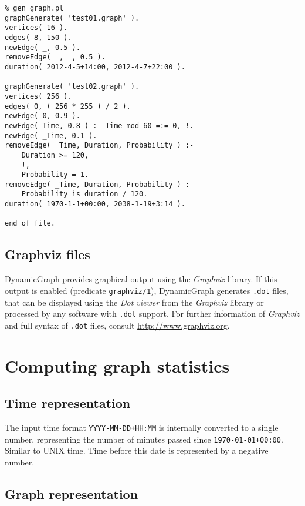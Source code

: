 \documentclass[11pt, a4paper,draft]{article}
\newcommand{\pl}[1]{\texttt{#1}} %
\theoremstyle{plain}
\theoremstyle{definition}
\theoremstyle{remark}
\newcommand{\gv}{\textit{Graphviz}}
\begin{document}
\begin{verbatim}
% gen_graph.pl
graphGenerate( 'test01.graph' ).
vertices( 16 ).
edges( 8, 150 ).
newEdge( _, 0.5 ).
removeEdge( _, _, 0.5 ).
duration( 2012-4-5+14:00, 2012-4-7+22:00 ).

graphGenerate( 'test02.graph' ).
vertices( 256 ).
edges( 0, ( 256 * 255 ) / 2 ).
newEdge( 0, 0.9 ).
newEdge( Time, 0.8 ) :- Time mod 60 =:= 0, !.
newEdge( _Time, 0.1 ).
removeEdge( _Time, Duration, Probability ) :-
    Duration >= 120,
    !,
    Probability = 1.
removeEdge( _Time, Duration, Probability ) :-
    Probability is duration / 120.
duration( 1970-1-1+00:00, 2038-1-19+3:14 ).

end_of_file.
\end{verbatim}

\subsection{Graphviz files}
\label{sec:files-graphviz}

DynamicGraph provides graphical output using the \gv{} library. 
If this output is enabled (predicate \pl{graphviz/1}), DynamicGraph generates \pl{.dot} files, 
that can be displayed using the \textit{Dot viewer} from the \gv{} library or processed
by any software with \texttt{.dot} support.
For further information of \gv{} and full syntax of \pl{.dot} files, consult \url{http://www.graphviz.org}.

\section{Computing graph statistics}
\label{sec:computing}



\subsection{Time representation}
\label{sec:computing-time}

The input time format \pl{YYYY-MM-DD+HH:MM} is internally converted to a single number,
representing the number of minutes passed since \pl{1970-01-01+00:00}. 
Similar to UNIX time. Time before this date is represented by a negative number.
 

\subsection{Graph representation}
\label{sec:computing-graph} 
\end{document}
